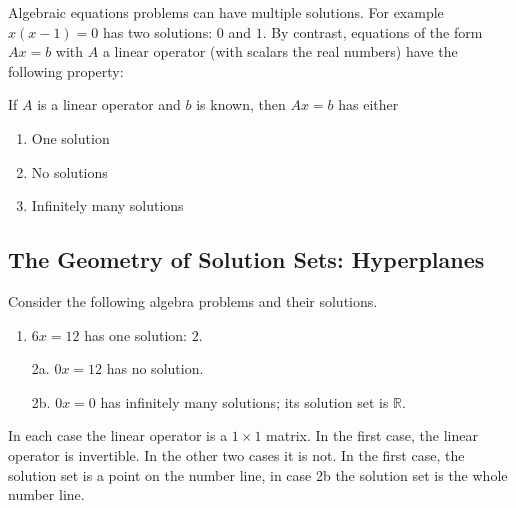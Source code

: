 Algebraic equations problems can have multiple solutions. For example $x(x-1)=0$ has  two solutions: $0$ and $1$. By contrast, equations of the form $Ax=b$ with $A$ a linear operator (with scalars the real numbers) have the following property:

\vspace{3mm}
\noindent
If $A$ is a linear operator and $b$ is  known, then $Ax=b$ has either
\begin{enumerate}
\item One solution
\item  No solutions
\item Infinitely many solutions
\end{enumerate}


\subsection{The Geometry of Solution Sets: Hyperplanes}
Consider the following algebra problems and their solutions.

\begin{enumerate}
\item $6x=12$ has one solution: $2$.
\item[2a.] $0x=12$ has no solution.
\item[2b.] $0x=0$ has infinitely many solutions; its solution set is $\mathbb{R}$.
\end{enumerate}
In each case the linear operator is a $1\times 1$ matrix. In the first case, the linear operator is invertible. 
In the other two cases it is not. 
In the first case, the solution set is a point on the number line, in  case 2b the solution set is the whole number line.

